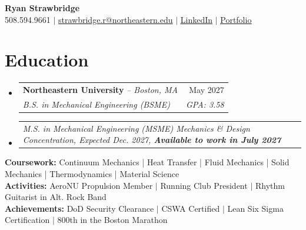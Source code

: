 \documentclass[letterpaper,10pt]{article}
\makeatletter
\newlength{\entrygap}     \setlength{\entrygap}{4pt}     %
\newcommand{\resumeSubSubheading}[2]{
  \vspace{2pt}\item
    \begin{tabular*}{\textwidth}[t]{l@{\extracolsep{\fill}}r}
      \textit{\small #1} & \textit{\small #2}
    \end{tabular*}\vspace{-13pt}
}
\newcommand{\resumeEducation}[5]{
  \vspace{\entrygap}\item
    \begin{tabular*}{\textwidth}[t]{l@{\extracolsep{\fill}}r}
      \textbf{#1} \textit{\small -- #2} & #3 \\
      \textit{\small #4} & \textit{\small #5}
    \end{tabular*}\vspace{-4pt}
}
\newcommand{\resumeSubHeadingListStart}{
  \begin{itemize}[
    leftmargin=0in,
    label={},
    topsep=-\entrygap,
    itemsep=0pt,
    parsep=0pt,
    partopsep=0pt
  ]
}
\newcommand{\resumeSubHeadingListEnd}{\end{itemize}}
\makeatother
\begin{document}

\begin{center}
    \textbf{\LARGE Ryan Strawbridge} \\ \vspace{3pt}
    \small
    508.594.9661 $|$
    \href{mailto:strawbridge.r@northeastern.edu}
    {strawbridge.r@northeastern.edu} $|$
    \href{https://www.linkedin.com/in/ryan-strawbridge}
    {\underline{LinkedIn}} $|$
    \href{https://ryanstrawbridge-2.github.io}
    {\underline{Portfolio}} 

\end{center}

\vspace{-10pt}


\section{Education}

\resumeSubHeadingListStart

  \resumeEducation
  {Northeastern University}{Boston, MA}{May 2027}
  {B.S. in Mechanical Engineering (BSME)}{GPA: 3.58}
\vspace{-2pt}
\resumeSubSubheading
  {M.S. in Mechanical Engineering (MSME) Mechanics 
  \& Design Concentration, Expected Dec. 2027, \textbf{Available to work in July 2027}}{}

\resumeSubHeadingListEnd

\vspace{\dimexpr\entrygap+4pt}

{\small
\textbf{Coursework:}
Continuum Mechanics | Heat Transfer | Fluid Mechanics | Solid Mechanics |
Thermodynamics | Material Science \\[3pt]
\textbf{Activities:}
AeroNU Propulsion Member $|$ Running Club President $|$
Rhythm Guitarist in Alt. Rock Band \\[3pt]
\textbf{Achievements:}
DoD Security Clearance $|$ CSWA Certified $|$ Lean Six Sigma Certification $|$
800th in the Boston Marathon
}

\end{document}
